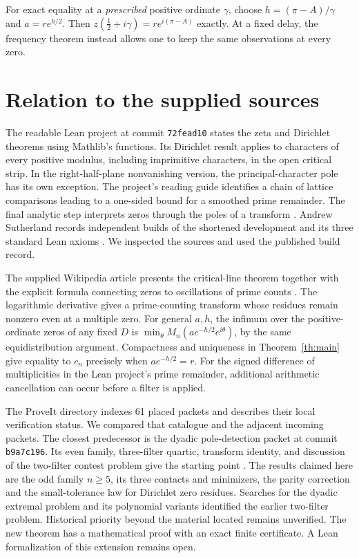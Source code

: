 \documentclass[11pt,letterpaper]{article}
\begin{document}
For exact equality at a \emph{prescribed} positive ordinate \(\gamma\),
choose \(h=(\pi-A)/\gamma\) and \(a=r e^{h/2}\). Then
\(z(\tfrac12+i\gamma)=r e^{i(\pi-A)}\) exactly. At a fixed delay, the
frequency theorem instead allows one to keep the same observations at every zero.

\newpage
\section{Relation to the supplied sources}
The readable Lean project at commit \texttt{72fead10} states the zeta and
Dirichlet theorems using Mathlib's functions. Its Dirichlet result applies
to characters of every positive modulus, including imprimitive characters,
in the open critical strip. In the right-half-plane nonvanishing version,
the principal-character pole has its own exception. The project's reading
guide identifies a chain of lattice comparisons leading to a one-sided
bound for a smoothed prime remainder. The final analytic step interprets
zeros through the poles of a transform \cite{lean}. Andrew Sutherland
records independent builds of the shortened development and its three
standard Lean axioms \cite{sutherland}. We inspected the sources and used the published build record.

The supplied Wikipedia article presents the critical-line theorem together
with the explicit formula connecting zeros to oscillations of prime counts
\cite{wiki}. The logarithmic derivative gives a prime-counting transform
whose residues remain nonzero even at a multiple zero. For general \(a,h\),
the infimum over the positive-ordinate zeros of any fixed \(D\) is
\(\min_\theta M_n(ae^{-h/2}e^{i\theta})\), by the same equidistribution
argument. Compactness and uniqueness in Theorem~\ref{th:main} give equality
to \(c_n\) precisely when \(a e^{-h/2}=r\). For the signed difference of
multiplicities in the Lean project's prime remainder, additional arithmetic
cancellation can occur before a filter is applied.

The ProveIt directory indexes 61 placed packets and describes their local
verification status. We compared that catalogue and the adjacent incoming
packets. The closest predecessor is the dyadic pole-detection packet at
commit \texttt{b9a7c196}. Its even family, three-filter quartic, transform
identity, and discussion of the two-filter contest problem give the starting
point \cite{packet,contest}. The results claimed here are the odd family
\(n\ge5\), its three contacts and minimizers, the parity correction and the
small-tolerance law for Dirichlet zero residues. Searches for the dyadic
extremal problem and its polynomial variants identified the earlier
two-filter problem. Historical priority beyond the material located remains
unverified. The new theorem has a mathematical proof with an exact finite
certificate. A Lean formalization of this extension remains open.
\end{document}
